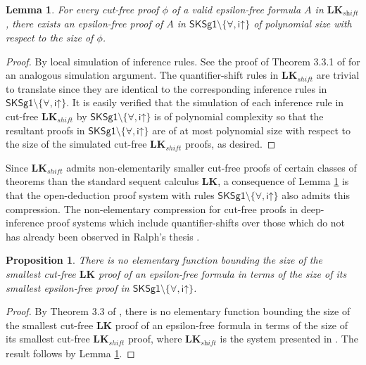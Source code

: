 \documentclass[10pt]{article}
\newtheorem{lemma}[theorem]{Lemma}
\newtheorem{proposition}[theorem]{Proposition}
\theoremstyle{definition}\newtheorem{remark}[theorem]{Remark}
\theoremstyle{definition}\newtheorem{example}[theorem]{Example}
\theoremstyle{definition}\newtheorem{definition}[theorem]{Definition}
\newcommand{\SKSq}{{\mathsf{SKSg1}}}
\newcommand{\iUp}{{\mathsf{i\mathord\uparrow}}}
\begin{document}
	\begin{lemma}\label{LKshiftSimulation}
		For every cut-free proof $\phi$ of a valid epsilon-free formula $A$ in $\textbf{LK}_{\textit{shift}}$, there exists an epsilon-free proof of $A$ in $\SKSq \setminus \{\forall, \iUp\}$ of polynomial size with respect to the size of $\phi$.
	\end{lemma}
	
	\begin{proof}
		By local simulation of inference rules. See the proof of Theorem 3.3.1 of \cite{KaiThesis} for an analogous simulation argument. The quantifier-shift rules in $\textbf{LK}_{shift}$ are trivial to translate since they are identical to the corresponding inference rules in $\SKSq \setminus \{\forall, \iUp\}$. It is easily verified that the simulation of each inference rule in cut-free $\textbf{LK}_{shift}$ by $\SKSq \setminus \{\forall, \iUp\}$ is of polynomial complexity so that the resultant proofs in $\SKSq \setminus \{\forall, \iUp\}$ are of at most polynomial size with respect to the size of the simulated cut-free $\textbf{LK}_{shift}$ proofs, as desired.
	\end{proof}

	Since $\textbf{LK}_{shift}$ admits non-elementarily smaller cut-free proofs of certain classes of theorems than the standard sequent calculus $\textbf{LK}$, a consequence of Lemma \ref{LKshiftSimulation} is that the open-deduction proof system with rules $\SKSq \setminus \{\forall, \iUp\}$ also admits this compression. The non-elementary compression for cut-free proofs in deep-inference proof systems which include quantifier-shifts over those which do not has already been observed in Ralph's thesis \cite{BenThesis}.
	
	\begin{proposition}\label{SKSqSpeedupOverLK}
		There is no elementary function bounding the size of the smallest cut-free $\textbf{LK}$ proof of an epsilon-free formula in terms of the size of its smallest epsilon-free proof in $\SKSq \setminus \{\forall, \iUp\}$.
	\end{proposition}
	
	\begin{proof}
		By Theorem 3.3 of \cite{BaazUnsoundInferences}, there is no elementary function bounding the size of the smallest cut-free $\textbf{LK}$ proof of an epsilon-free formula in terms of the size of its smallest cut-free $\textbf{LK}_{shift}$ proof, where $\textbf{LK}_\textit{shift}$ is the system presented in \cite{BaazUnsoundInferences}. The result follows by Lemma \ref{LKshiftSimulation}.
	\end{proof}
	
\end{document}
